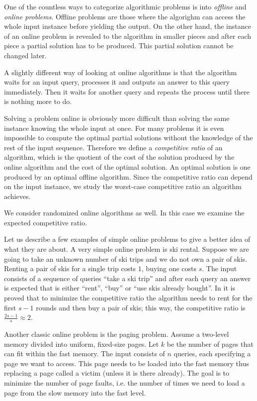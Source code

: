 One of the countless ways to categorize algorithmic problems is into
\emph{offline} and \emph{online problems}. Offline problems are those
where the algorighm can access the whole input instance before yielding
the output.  On the other hand, the instance of an online problem is
revealed to the algorithm in smaller pieces and after each piece a partial
solution has to be produced. This partial solution cannot be changed
later.

A slightly different way of looking at online algorithms is that the
algorithm waits for an input query, processes it and outputs an answer to
this query immediately. Then it waits for another query and repeats the
process until there is nothing more to do.

Solving a problem online is obviously more difficult than solving the same
instance knowing the whole input at once. For many problems it is even
impossible to compute the optimal partial solutions without the knowledge
of the rest of the input sequence. Therefore we define a \emph{competitive
ratio} of an algorithm, which is the quotient of the cost of the solution
produced by the online algorithm and the cost of the optimal solution. An
optimal solution is one produced by an optimal offline algorithm. Since
the competitive ratio can depend on the input instance, we study the
worst-case competitive ratio an algorithm achieves.

We consider randomized online algorithms as well. In this case we examine
the expected competitive ratio. 

Let us describe a few examples of simple online problems to give a better
idea of what they are about. A very simple online problem is ski rental.
Suppose we are going to take an unknown number of ski trips and we do not
own a pair of skis. Renting a pair of skis for a single trip costs $1$,
buying one costs $s$. The input consists of a sequence of queries ``take a
ski trip'' and after each query an answer is expected that is either
``rent'', ``buy'' or ``use skis already bought''. In \cite{skirental} it
is proved that to minimize the competitive ratio the algorithm needs to
rent for the first $s-1$ rounds and then buy a pair of skis; this way, the
competitive ratio is $\frac{2s-1}{s} \approx 2$.

Another classic online problem is the paging problem. Assume a two-level
memory divided into uniform, fixed-size pages. Let $k$ be the number of
pages that can fit within the fast memory. The input consists of $n$
queries, each specifying a page we want to access. This page needs to be
loaded into the fast memory thus replacing a page called a victim (unless
it is there already). The goal is to minimize the number of page faults,
i.e. the number of times we need to load a page from the slow memory into
the fast level.

